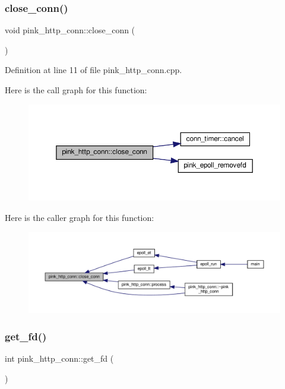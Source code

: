 \subsubsection{\texorpdfstring{close\+\_\+conn()}{close\_conn()}}
{\footnotesize\ttfamily void pink\+\_\+http\+\_\+conn\+::close\+\_\+conn (\begin{DoxyParamCaption}{ }\end{DoxyParamCaption})}



Definition at line 11 of file pink\+\_\+http\+\_\+conn.\+cpp.

Here is the call graph for this function\+:\nopagebreak
\begin{figure}[H]
\begin{center}
\leavevmode
\includegraphics[width=350pt]{classpink__http__conn_abdcd7c0da8072d62cb7212523f20298b_cgraph}
\end{center}
\end{figure}
Here is the caller graph for this function\+:\nopagebreak
\begin{figure}[H]
\begin{center}
\leavevmode
\includegraphics[width=350pt]{classpink__http__conn_abdcd7c0da8072d62cb7212523f20298b_icgraph}
\end{center}
\end{figure}
\mbox{\label{classpink__http__conn_aa304899ec9a7f6d7a2a9d738309a9570}} 
\subsubsection{\texorpdfstring{get\+\_\+fd()}{get\_fd()}}
{\footnotesize\ttfamily int pink\+\_\+http\+\_\+conn\+::get\+\_\+fd (\begin{DoxyParamCaption}{ }\end{DoxyParamCaption})}



